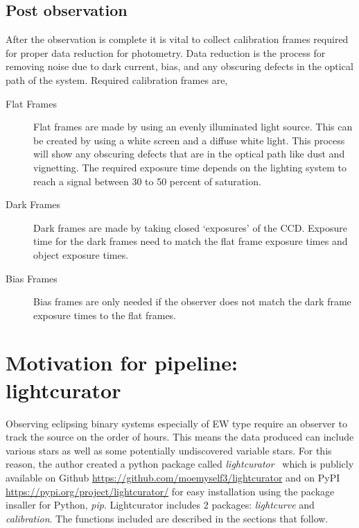 \subsection{Post observation}
After the observation is complete it is vital to collect calibration frames required for proper data reduction for photometry.
Data reduction is the process for removing noise due to dark current, bias, and any obscuring defects in the optical path of the system.
Required calibration frames are,
\begin{description}
    \item[Flat Frames] Flat frames are made by using an evenly illuminated light source. This can be created by using a white screen
        and a diffuse white light. This process will show any obscuring defects that are in the optical path like dust and vignetting.
        The required exposure time depends on the lighting system to reach a signal between 30 to 50 percent of saturation.
    \item[Dark Frames] Dark frames are made by taking closed `exposures' of the CCD\@. Exposure time for the dark frames need to match
        the flat frame exposure times and object exposure times.
    \item[Bias Frames] Bias frames are only needed if the observer does not match the dark frame exposure times to the flat frames.
\end{description}

\section{Motivation for pipeline: lightcurator}
Observing eclipsing binary systems especially of EW type require an observer to track the source on the order of hours.
This means the data produced can include various stars as well as some potentially undiscovered variable stars.
For this reason, the author created a python package called 
\textit{lightcurator}~\cite{castillo_2019} which is publicly available on Github \url{https://github.com/moemyself3/lightcurator}
and on PyPI \url{https://pypi.org/project/lightcurator/} for easy installation using the package insaller for Python, \textit{pip}.
Lightcurator includes 2 packages: \textit{lightcurve} and \textit{calibration}.
The functions included are described in the sections that follow.

